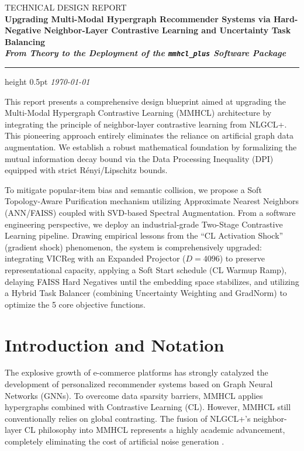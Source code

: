 \thispagestyle{empty}
\begin{tcolorbox}[
  enhanced, colback=accentblue!6, colframe=accentblue, arc=4pt, boxrule=1.2pt,
  left=18pt, right=18pt, top=18pt, bottom=14pt, before skip=0pt, after skip=18pt,
]
  {\sffamily\small\color{accentblue!80}TECHNICAL DESIGN REPORT}\\[6pt]
  {\LARGE\bfseries\color{accentblue}
    Upgrading Multi-Modal Hypergraph Recommender Systems via Hard-Negative Neighbor-Layer Contrastive Learning and Uncertainty Task Balancing\\[5pt]
    \normalsize\itshape From Theory to the Deployment of the \texttt{mmhcl\_plus} Software Package}\\[10pt]
  \hrule height 0.5pt\relax
  \vspace{6pt}
  {\small\itshape\color{accentblue!70} \today}
\end{tcolorbox}

\begin{tcolorbox}[abstractstyle, title={Abstract}]
This report presents a comprehensive design blueprint aimed at upgrading the Multi-Modal Hypergraph Contrastive Learning (MMHCL) architecture by integrating the principle of neighbor-layer contrastive learning from NLGCL+. This pioneering approach entirely eliminates the reliance on artificial graph data augmentation. We establish a robust mathematical foundation by formalizing the mutual information decay bound via the Data Processing Inequality (DPI) equipped with strict R\'enyi/Lipschitz bounds. 

To mitigate popular-item bias and semantic collision, we propose a Soft Topology-Aware Purification mechanism utilizing Approximate Nearest Neighbors (ANN/FAISS) coupled with SVD-based Spectral Augmentation. From a software engineering perspective, we deploy an industrial-grade Two-Stage Contrastive Learning pipeline. Drawing empirical lessons from the ``CL Activation Shock'' (gradient shock) phenomenon, the system is comprehensively upgraded: integrating VICReg with an Expanded Projector ($D=4096$) to preserve representational capacity, applying a Soft Start schedule (CL Warmup Ramp), delaying FAISS Hard Negatives until the embedding space stabilizes, and utilizing a Hybrid Task Balancer (combining Uncertainty Weighting and GradNorm) to optimize the 5 core objective functions.
\end{tcolorbox}

\section{Introduction and Notation}
The explosive growth of e-commerce platforms has strongly catalyzed the development of personalized recommender systems based on Graph Neural Networks (GNNs). To overcome data sparsity barriers, MMHCL applies hypergraphs combined with Contrastive Learning (CL). However, MMHCL still conventionally relies on global contrasting. The fusion of NLGCL+'s neighbor-layer CL philosophy into MMHCL represents a highly academic advancement, completely eliminating the cost of artificial noise generation \cite{guo2025mmhcl, feng2025nlgcl}.

